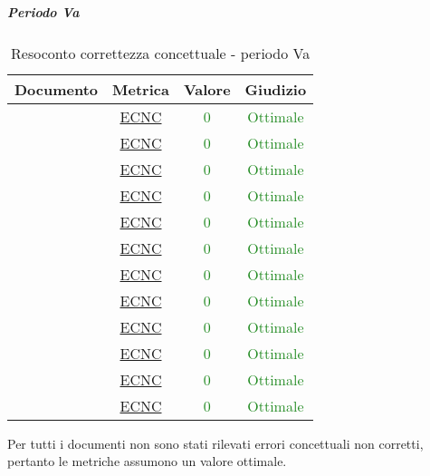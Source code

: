 							\subparagraph{Periodo Va}
							
							\begin{table}[H]
								\centering
								\small
								\begin{tabular}{c | c | c | c}
									\hline
									\textbf{Documento} & \textbf{Metrica}    & \textbf{Valore} & \textbf{Giudizio} \\ \hline
									\pdpv        & \hyperref[MLEC]{ECNC} & \textcolor{ForestGreen}{0} & \textcolor{ForestGreen}{Ottimale} \\
									\pdqv        & \hyperref[MLEC]{ECNC} & \textcolor{ForestGreen}{0} & \textcolor{ForestGreen}{Ottimale} \\
									\ndpv        & \hyperref[MLEC]{ECNC} & \textcolor{ForestGreen}{0} & \textcolor{ForestGreen}{Ottimale} \\
									\adrv        & \hyperref[MLEC]{ECNC}  & \textcolor{ForestGreen}{0} & \textcolor{ForestGreen}{Ottimale} \\
									\stv		& \hyperref[MLEC]{ECNC}  & \textcolor{ForestGreen}{0} & \textcolor{ForestGreen}{Ottimale} \\
									\glv       & \hyperref[MLEC]{ECNC} & \textcolor{ForestGreen}{0} & \textcolor{ForestGreen}{Ottimale} \\
									\ddpv        & \hyperref[MLEC]{ECNC} & \textcolor{ForestGreen}{0} & \textcolor{ForestGreen}{Ottimale} \\
									\manutv        & \hyperref[MLEC]{ECNC} & \textcolor{ForestGreen}{0} & \textcolor{ForestGreen}{Ottimale} \\
									\manmanv        & \hyperref[MLEC]{ECNC} & \textcolor{ForestGreen}{0} & \textcolor{ForestGreen}{Ottimale} \\
									\vnovei       & \hyperref[MLEC]{ECNC}& \textcolor{ForestGreen}{0} & \textcolor{ForestGreen}{Ottimale} \\
									\vcinquee       & \hyperref[MLEC]{ECNC}& \textcolor{ForestGreen}{0} & \textcolor{ForestGreen}{Ottimale} \\
									\vseie       & \hyperref[MLEC]{ECNC}& \textcolor{ForestGreen}{0} & \textcolor{ForestGreen}{Ottimale} \\
								\end{tabular}
								\caption{Resoconto correttezza concettuale - periodo Va}
								\label{tab_resoconto_correttezza_concettuale_PVA}
							\end{table}
							
							Per tutti i documenti non sono stati rilevati errori concettuali non corretti, pertanto le metriche assumono un valore ottimale.
				\newpage
